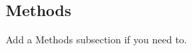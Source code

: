 \documentclass[9pt,twoside,lineno]{pnas-new}
\begin{document}
\subsection*{Methods}
Add a Methods subsection if you need to.
\fi

\end{document}
